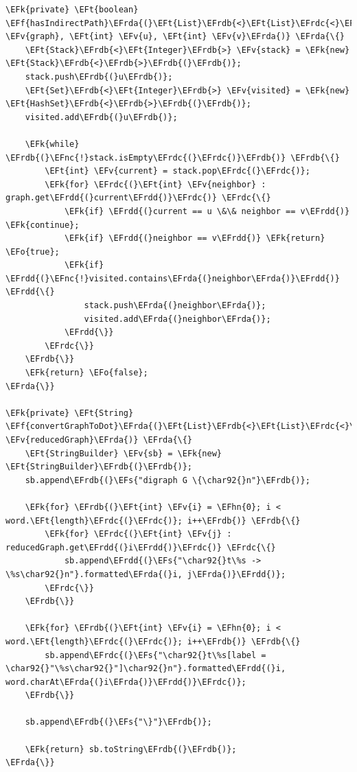 \documentclass[11pt]{article}
\newcommand{\EFs}[1]{\textcolor{EFs}{#1}} %
\newcommand{\EFk}[1]{\textcolor{EFk}{#1}} %
\newcommand{\EFf}[1]{\textcolor{EFf}{#1}} %
\newcommand{\EFv}[1]{\textcolor{EFv}{#1}} %
\newcommand{\EFt}[1]{\textcolor{EFt}{#1}} %
\newcommand{\EFo}[1]{\textcolor{EFo}{#1}} %
\newcommand{\EFnc}[1]{\textcolor{EFnc}{\textbf{#1}}} %
\newcommand{\EFhn}[1]{\textcolor{EFhn}{#1}} %
\newcommand{\EFrda}[1]{#1} %
\newcommand{\EFrdb}[1]{\textcolor{EFrdb}{#1}} %
\newcommand{\EFrdc}[1]{\textcolor{EFrdc}{#1}} %
\newcommand{\EFrdd}[1]{\textcolor{EFrdd}{#1}} %
\begin{document}
\begin{Code}
\begin{Verbatim}
\EFk{private} \EFt{boolean} \EFf{hasIndirectPath}\EFrda{(}\EFt{List}\EFrdb{<}\EFt{List}\EFrdc{<}\EFt{Integer}\EFrdc{>}\EFrdb{>} \EFv{graph}, \EFt{int} \EFv{u}, \EFt{int} \EFv{v}\EFrda{)} \EFrda{\{}
    \EFt{Stack}\EFrdb{<}\EFt{Integer}\EFrdb{>} \EFv{stack} = \EFk{new} \EFt{Stack}\EFrdb{<}\EFrdb{>}\EFrdb{(}\EFrdb{)};
    stack.push\EFrdb{(}u\EFrdb{)};
    \EFt{Set}\EFrdb{<}\EFt{Integer}\EFrdb{>} \EFv{visited} = \EFk{new} \EFt{HashSet}\EFrdb{<}\EFrdb{>}\EFrdb{(}\EFrdb{)};
    visited.add\EFrdb{(}u\EFrdb{)};

    \EFk{while} \EFrdb{(}\EFnc{!}stack.isEmpty\EFrdc{(}\EFrdc{)}\EFrdb{)} \EFrdb{\{}
        \EFt{int} \EFv{current} = stack.pop\EFrdc{(}\EFrdc{)};
        \EFk{for} \EFrdc{(}\EFt{int} \EFv{neighbor} : graph.get\EFrdd{(}current\EFrdd{)}\EFrdc{)} \EFrdc{\{}
            \EFk{if} \EFrdd{(}current == u \&\& neighbor == v\EFrdd{)} \EFk{continue};
            \EFk{if} \EFrdd{(}neighbor == v\EFrdd{)} \EFk{return} \EFo{true};
            \EFk{if} \EFrdd{(}\EFnc{!}visited.contains\EFrda{(}neighbor\EFrda{)}\EFrdd{)} \EFrdd{\{}
                stack.push\EFrda{(}neighbor\EFrda{)};
                visited.add\EFrda{(}neighbor\EFrda{)};
            \EFrdd{\}}
        \EFrdc{\}}
    \EFrdb{\}}
    \EFk{return} \EFo{false};
\EFrda{\}}

\EFk{private} \EFt{String} \EFf{convertGraphToDot}\EFrda{(}\EFt{List}\EFrdb{<}\EFt{List}\EFrdc{<}\EFt{Integer}\EFrdc{>}\EFrdb{>} \EFv{reducedGraph}\EFrda{)} \EFrda{\{}
    \EFt{StringBuilder} \EFv{sb} = \EFk{new} \EFt{StringBuilder}\EFrdb{(}\EFrdb{)};
    sb.append\EFrdb{(}\EFs{"digraph G \{\char92{}n"}\EFrdb{)};

    \EFk{for} \EFrdb{(}\EFt{int} \EFv{i} = \EFhn{0}; i < word.\EFt{length}\EFrdc{(}\EFrdc{)}; i++\EFrdb{)} \EFrdb{\{}
        \EFk{for} \EFrdc{(}\EFt{int} \EFv{j} : reducedGraph.get\EFrdd{(}i\EFrdd{)}\EFrdc{)} \EFrdc{\{}
            sb.append\EFrdd{(}\EFs{"\char92{}t\%s -> \%s\char92{}n"}.formatted\EFrda{(}i, j\EFrda{)}\EFrdd{)};
        \EFrdc{\}}
    \EFrdb{\}}

    \EFk{for} \EFrdb{(}\EFt{int} \EFv{i} = \EFhn{0}; i < word.\EFt{length}\EFrdc{(}\EFrdc{)}; i++\EFrdb{)} \EFrdb{\{}
        sb.append\EFrdc{(}\EFs{"\char92{}t\%s[label = \char92{}"\%s\char92{}"]\char92{}n"}.formatted\EFrdd{(}i, word.charAt\EFrda{(}i\EFrda{)}\EFrdd{)}\EFrdc{)};
    \EFrdb{\}}

    sb.append\EFrdb{(}\EFs{"\}"}\EFrdb{)};

    \EFk{return} sb.toString\EFrdb{(}\EFrdb{)};
\EFrda{\}}
\end{Verbatim}
\end{Code}
\end{document}

